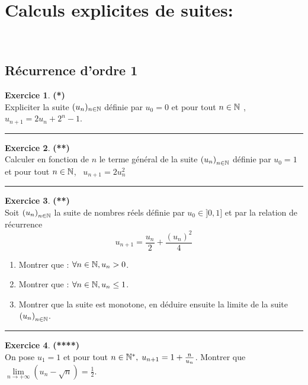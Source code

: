 \documentclass[a4paper,11pt]{article}
\theoremstyle{definition}
\newtheorem{exo}{Exercice} %
\begin{document}
\section*{Calculs explicites de suites:}\hfill\\%
\begin{minipage}{1\linewidth}

	
	\begin{minipage}[t]{0.48\linewidth}
		\raggedright
	
		\subsection*{Récurrence d’ordre 1}	
		
\begin{exo}\textbf{(*)}\quad\\[0.2cm]
	Expliciter la suite $(u_n )_{n\in\mathbb{N}}$ définie par $u_0 = 0$ et pour tout $n\in\mathbb{N}$ , 
	$u_{n+1} = 2u_n + 2^n - 1$.
	
\centering
	\rule{1\linewidth}{0.6pt}
\end{exo}



\begin{exo}\textbf{(**)}\quad\\[0.2cm]
 	Calculer en fonction de $n$ le terme général de la suite $\left(u_n\right)_{n\in\mathbb{N}}$ définie par $u_0 = 1$ et pour tout $n\in\mathbb{N}$, \ $u_{n+1} = 2u_n^2$
 		
 	
	\centering
	\rule{1\linewidth}{0.6pt}
\end{exo}

\begin{exo}\textbf{(**)}\quad\\[0.2cm]

	Soit $\left(u_n\right)_{n\in\mathbb{N}}$ la suite de nombres réels définie par $u_0 \in ]0,1]$ et par la relation de récurrence 
	$$u_{n+1} = \dfrac{u_n}{2} + \dfrac{(u_n)^2}{4}$$
	
	\begin{enumerate}
		\item Montrer que : $\forall n\in \mathbb{N}, u_n > 0$.
		\item Montrer que : $\forall n\in \mathbb{N}, u_n \leq 1$.
		\item Montrer que la suite est monotone, en déduire ensuite la limite de la suite $\left(u_n\right)_{n\in\mathbb{N}}$.
	\end{enumerate}
	\centering
	\rule{1\linewidth}{0.6pt}
\end{exo}

\begin{exo}\textbf{(****)}\quad\\[0.2cm]%
	On pose $u_1=1$ et pour tout $ n\in\mathbb{N}^*,\;u_{n+1}=1+\frac{n}{u_n}$. Montrer que $\lim\limits_{n\rightarrow +\infty}(u_n-\sqrt{n})=\frac{1}{2}$.
	

\end{exo}
\end{minipage}
\end{minipage}
\end{document}
